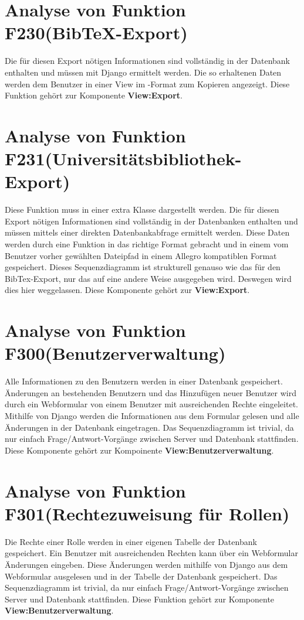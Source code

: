\section{Analyse von Funktion F230(Bib\TeX -Export)}
Die für diesen Export nötigen Informationen sind vollständig in der Datenbank enthalten und müssen mit Django ermittelt werden. Die so erhaltenen Daten werden dem Benutzer in einer View im \BibTeX -Format zum Kopieren angezeigt. Diese Funktion gehört zur Komponente \textbf{View:Export}. 

\section{Analyse von Funktion F231(Universitätsbibliothek-Export)}
Diese Funktion muss in einer extra Klasse dargestellt werden. Die für diesen Export nötigen Informationen sind vollständig in der Datenbanken enthalten und müssen mittels einer direkten Datenbankabfrage ermittelt werden. Diese Daten werden durch eine Funktion in das richtige Format gebracht und in einem vom Benutzer vorher gewählten Dateipfad in einem Allegro kompatiblen Format gespeichert. Dieses Sequenzdiagramm ist strukturell genauso wie das für den BibTex-Export, nur das auf eine andere Weise ausgegeben wird. Deswegen wird dies hier weggelassen. Diese Komponente gehört zur \textbf{View:Export}.

\section{Analyse von Funktion F300(Benutzerverwaltung)}
Alle Informationen zu den Benutzern werden in einer Datenbank gespeichert. Änderungen an bestehenden Benutzern und das Hinzufügen neuer Benutzer wird durch ein Webformular von einem Benutzer mit ausreichenden Rechte eingeleitet. Mithilfe von Django werden die Informationen aus dem Formular gelesen und alle Änderungen in der Datenbank eingetragen. Das Sequenzdiagramm ist trivial, da nur einfach Frage/Antwort-Vorgänge zwischen Server und Datenbank stattfinden. Diese Komponente gehört zur Kompoinente \textbf{View:Benutzerverwaltung}.

\section{Analyse von Funktion F301(Rechtezuweisung für Rollen)}
Die Rechte einer Rolle werden in einer eigenen Tabelle der Datenbank gespeichert. Ein Benutzer mit ausreichenden Rechten kann über ein Webformular Änderungen eingeben. Diese Änderungen werden mithilfe von Django aus dem Webformular ausgelesen und in der Tabelle der Datenbank gespeichert. Das Sequenzdiagramm ist trivial, da nur einfach Frage/Antwort-Vorgänge zwischen Server und Datenbank stattfinden. Diese Funktion gehört zur Komponente \textbf{View:Benutzerverwaltung}.

